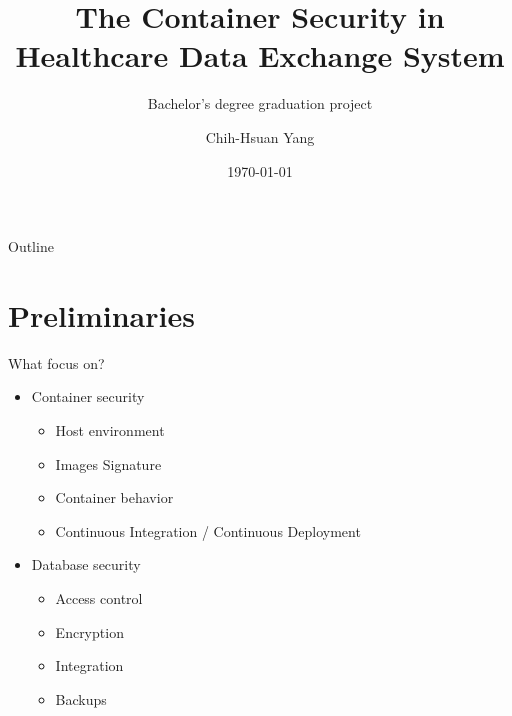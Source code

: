\documentclass{beamer}
\title{The Container Security in Healthcare Data Exchange System}
\subtitle{Bachelor's degree graduation project}
\author{Chih-Hsuan Yang}
\institute{National Sun Yat-sen University\\
Advisor: Chun-I Fan
}
\date{\today}
\begin{document}
\begin{CJK*}{UTF8}{bsmi}

  \begin{frame}
    \titlepage
  \end{frame}

  \begin{frame}{Outline}
    \begin{multicols}{2}
      \tableofcontents
    \end{multicols}
  \end{frame}

  \section{Preliminaries}
  \begin{frame}{What focus on?}
    \begin{multicols*}{2}
      \begin{itemize}
        \item Container security
              \begin{itemize}
                \item Host environment
                \item Images Signature
                \item Container behavior
                \item Continuous Integration / Continuous Deployment
              \end{itemize}
      \end{itemize}
      \begin{itemize}
        \item Database security
              \begin{itemize}
                \item Access control
                \item Encryption
                \item Integration
                \item Backups
              \end{itemize}
      \end{itemize}
    \end{multicols*}
  \end{frame}


\end{CJK*}
\end{document}
